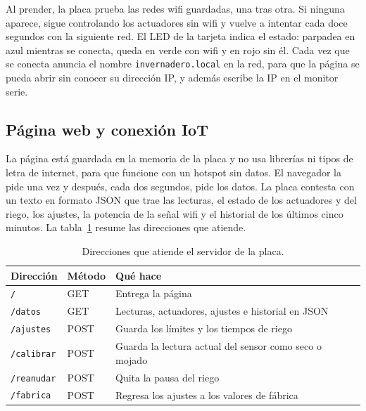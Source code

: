 \documentclass[12pt, letterpaper]{article}
\begin{document}
Al prender, la placa prueba las redes wifi guardadas, una tras otra. Si ninguna aparece, sigue controlando los
actuadores sin wifi y vuelve a intentar cada doce segundos con la siguiente red. El LED de la tarjeta indica el estado:
parpadea en azul mientras se conecta, queda en verde con wifi y en rojo sin él. Cada vez que se conecta anuncia el
nombre \texttt{invernadero.local} en la red, para que la página se pueda abrir sin conocer su dirección IP, y además
escribe la IP en el monitor serie.

\subsection{Página web y conexión IoT}

La página está guardada en la memoria de la placa y no usa librerías ni tipos de letra de internet, para que funcione
con un hotspot sin datos. El navegador la pide una vez y después, cada dos segundos, pide los datos. La placa contesta
con un texto en formato JSON que trae las lecturas, el estado de los actuadores y del riego, los ajustes, la potencia de
la señal wifi y el historial de los últimos cinco minutos. La tabla~\ref{tab:rutas} resume las direcciones que atiende.

\begin{table}[H]
\centering
\begin{tabularx}{\textwidth}{llX}
\toprule
\textbf{Dirección} & \textbf{Método} & \textbf{Qué hace} \\
\midrule
\texttt{/} & GET & Entrega la página \\
\texttt{/datos} & GET & Lecturas, actuadores, ajustes e historial en JSON \\
\texttt{/ajustes} & POST & Guarda los límites y los tiempos de riego \\
\texttt{/calibrar} & POST & Guarda la lectura actual del sensor como seco o mojado \\
\texttt{/reanudar} & POST & Quita la pausa del riego \\
\texttt{/fabrica} & POST & Regresa los ajustes a los valores de fábrica \\
\bottomrule
\end{tabularx}
\caption{Direcciones que atiende el servidor de la placa.}
\label{tab:rutas}
\end{table}
\end{document}
